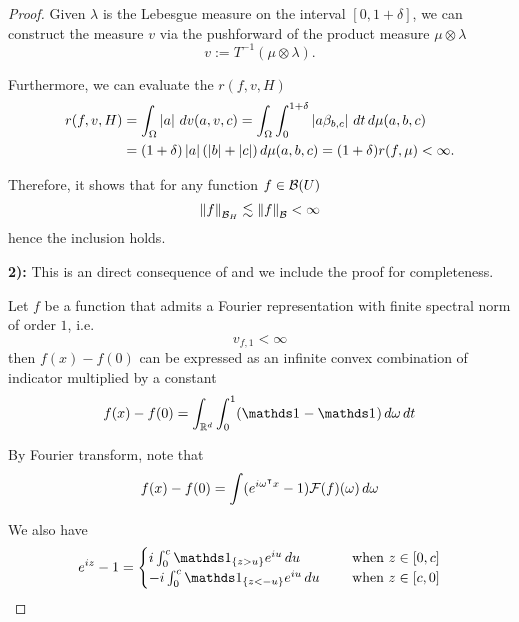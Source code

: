 \begin{proof}
Given $\lambda$ is the Lebesgue measure on the interval $[0,1+\delta]$, we can
construct the measure $v$ via the pushforward of the product measure
$\mu\otimes\lambda$
\begin{equation}
    v := T^{-1}(\mu\otimes\lambda).
\end{equation}

Furthermore, we can evaluate the $r(f, v, H)$
\begin{align}
    r(f, v, H) 
    &= \int_{\Omega} \left| a \right| \,dv(a,v,c) 
    = \int_{\Omega}\int_0^{1+\delta} \left| a\beta_{b,c} \right| \,dt\,d\mu(a,b,c) \\
    &= (1+\delta) \left| a \right|(\left| b \right| + \left| c \right|) \,d\mu(a,b,c)
    = (1+\delta) r(f,\mu) < \infty.
\end{align}

Therefore, it shows that for any function $f \in \mathcal{B}(U)$
\begin{equation}
    \left\| f \right\|_{\mathcal{B}_H} \lesssim \left\| f \right\|_{\mathcal{B}} < \infty
\end{equation}
hence the inclusion holds.

\textbf{2):} This is an direct consequence of \cite[Theorem
2]{barronNeuralNetApproximation1992} and we include the proof for completeness.

\begin{theorem}
    Let $f$ be a function that admits a Fourier representation with finite
    spectral norm of order $1$, i.e.
    \begin{equation}
        v_{f,1} < \infty
    \end{equation}
    then $f(x) - f(0)$ can be expressed as an infinite convex combination of
    indicator multiplied by a constant
    \begin{equation}
        f(x) - f(0) = \int_{\R^d}\int_0^1 (
            \indicator{} - \indicator{}
        ) \,d\omega\,dt
    \end{equation}
\end{theorem}

By Fourier transform, note that
\begin{equation}
    f(x) - f(0) = \int (e^{i\omega{}^{\intercal} x} - 1) \mathcal{F}(f)(\omega)\,d\omega
\end{equation}

We also have
\begin{equation}
    e^{iz} - 1 =
    \begin{cases}
        i \int_0^c \indicator{\{z>u\}} e^{iu} \,du \quad
            &\text{ when } z \in [0,c] \\
        -i \int_0^c \indicator{\{z<-u\}} e^{iu} \,du \quad
            &\text{ when } z \in [c,0] 
    \end{cases}
\end{equation}


\end{proof}
